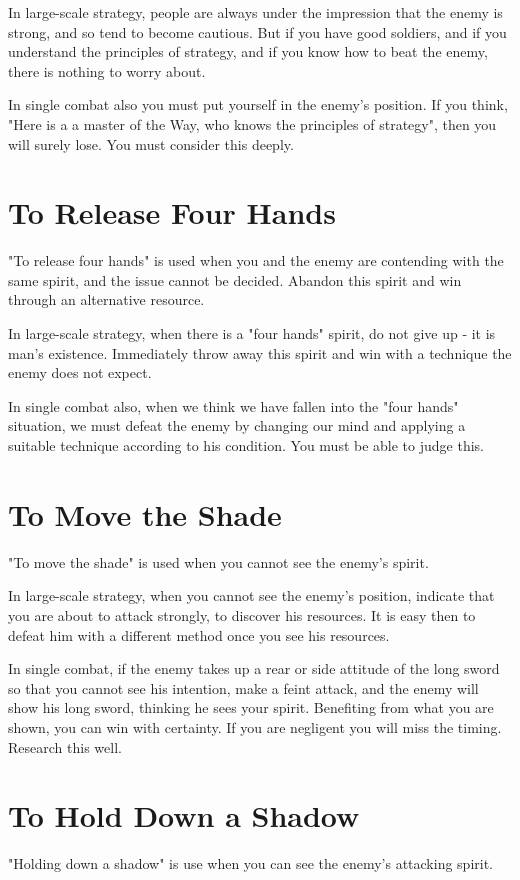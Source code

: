 \documentclass[12pt]{report}
\begin{document}
In large-scale strategy, people are always under the impression that the enemy is strong, and so tend to become cautious. But if you have good soldiers, and if you understand the principles of strategy, and if you know how to beat the enemy, there is nothing to worry about.

In single combat also you must put yourself in the enemy's position. If you think, "Here is a a master of the Way, who knows the principles of strategy", then you will surely lose. You must consider this deeply.
\section*{To Release Four Hands}
"To release four hands" is used when you and the enemy are contending with the same spirit, and the issue cannot be decided. Abandon this spirit and win through an alternative resource.

In large-scale strategy, when there is a "four hands" spirit, do not give up - it is man's existence. Immediately throw away this spirit and win with a technique the enemy does not expect.

In single combat also, when we think we have fallen into the "four hands" situation, we must defeat the enemy by changing our mind and applying a suitable technique according to his condition. You must be able to judge this.
\section*{To Move the Shade}
"To move the shade" is used when you cannot see the enemy's spirit.

In large-scale strategy, when you cannot see the enemy's position, indicate that you are about to attack strongly, to discover his resources. It is easy then to defeat him with a different method once you see his resources.

In single combat, if the enemy takes up a rear or side attitude of the long sword so that you cannot see his intention, make a feint attack, and the enemy will show his long sword, thinking he sees your spirit. Benefiting from what you are shown, you can win with certainty. If you are negligent you will miss the timing. Research this well.
\section*{To Hold Down a Shadow}
"Holding down a shadow" is use when you can see the enemy's attacking spirit.
\end{document}
